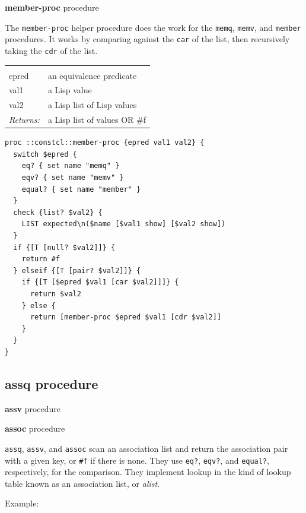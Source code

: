 \documentclass[twoside,9pt]{report}
\begin{document}
\textbf{member-proc} procedure


The \texttt{member-proc} helper procedure does the work for the \texttt{memq}, \texttt{memv}, and \texttt{member} procedures. It works by comparing against the \texttt{car} of the list, then recursively taking the \texttt{cdr} of the list.

\noindent\begin{tabular}{ |p{1.9cm} p{8cm}| }
\hline
\rowcolor[HTML]{CCCCCC} \multicolumn{2}{|l|}{\bf member-proc (internal)} \\
epred & an equivalence predicate \\
val1 & a Lisp value \\
val2 & a Lisp list of Lisp values \\
\textit{Returns:} & a Lisp list of values OR \#f \\
\hline
\end{tabular}
\begin{lstlisting}
proc ::constcl::member-proc {epred val1 val2} {
  switch $epred {
    eq? { set name "memq" }
    eqv? { set name "memv" }
    equal? { set name "member" }
  }
  check {list? $val2} {
    LIST expected\n($name [$val1 show] [$val2 show])
  }
  if {[T [null? $val2]]} {
    return #f
  } elseif {[T [pair? $val2]]} {
    if {[T [$epred $val1 [car $val2]]]} {
      return $val2
    } else {
      return [member-proc $epred $val1 [cdr $val2]]
    }
  }
}
\end{lstlisting}
\subsection{assq procedure}
\label{assq-procedure}

\noindent \textbf{assv} procedure


\noindent \textbf{assoc} procedure



\texttt{assq}, \texttt{assv}, and \texttt{assoc} scan an association list and return the association pair with a given key, or \texttt{\#f} if there is none. They use \texttt{eq?}, \texttt{eqv?}, and \texttt{equal?}, respectively, for the comparison. They implement lookup in the kind of lookup table known as an association list, or \emph{alist}.


Example:
\end{document}
